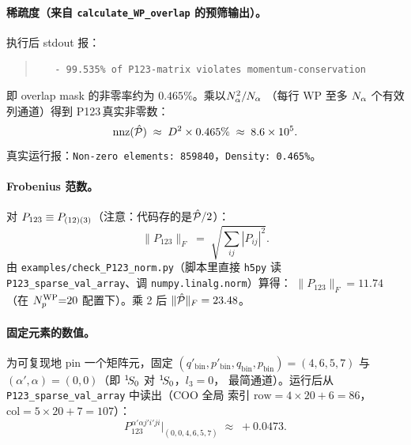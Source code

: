 \paragraph{稀疏度（来自 \texttt{calculate\_WP\_overlap} 的预筛输出）。}
执行后 stdout 报：
\begin{quote}
\verb|   - 99.535% of P123-matrix violates momentum-conservation|
\end{quote}
即 overlap mask 的非零率约为 \(0.465\%\)。乘以\(N_\alpha^2/N_\alpha\)
（每行 WP 至多 \(N_\alpha\) 个有效列通道）得到 P123\(\,\)真实非零数：
\begin{equation}
\text{nnz}(\hat{\mathcal{P}}) \;\approx\; D^2 \times 0.465\% \;\approx\; 8.6\times 10^{5}.
\end{equation}
真实运行报：\verb|Non-zero elements: 859840|，\verb|Density: 0.465%|。

\paragraph{Frobenius 范数。}
对 \(P_{123}\equiv P_{(12)(3)}\)（注意：代码存的是\(\hat{\mathcal{P}}/2\)）：
\begin{equation}
\|P_{123}\|_F \;=\; \sqrt{\sum_{ij}|P_{ij}|^2}.
\end{equation}
由 \verb|examples/check_P123_norm.py|（脚本里直接 \texttt{h5py} 读
\texttt{P123\_sparse\_val\_array}、调 \texttt{numpy.linalg.norm}）算得：
\(\|P_{123}\|_F = 11.74\)（在 \({N_{p}^{\text{WP}}}{=}20\) 配置下）。乘 2 后 \(\|\hat{\mathcal{P}}\|_F=23.48\)。

\paragraph{固定元素的数值。}
为可复现地 pin 一个矩阵元，固定 \((q'_{\text{bin}}, p'_{\text{bin}}, q_{\text{bin}}, p_{\text{bin}}) = (4, 6, 5, 7)\)
与 \((\alpha', \alpha)=(0, 0)\)（即 \({}^{1}\!S_{0}\) 对 \({}^{1}\!S_{0}\)，\(l_3=0\)，
最简通道）。运行后从 \texttt{P123\_sparse\_val\_array} 中读出（COO 全局
索引 \(\text{row}=4\!\times\!20+6=86\)，\(\text{col}=5\!\times\!20+7=107\)）：
\begin{equation}
P_{123}^{\alpha'\alpha j' i' j i}\Big|_{(0,0,4,6,5,7)} \;\approx\; +0.0473.
\end{equation}

